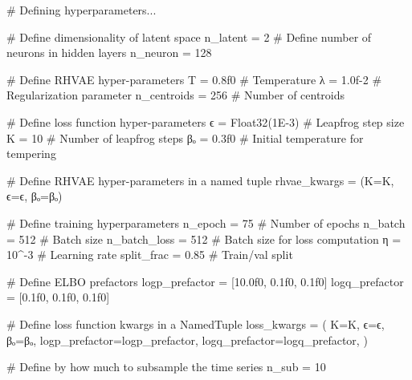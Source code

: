 \documentclass[
]{scrartcl}
\newenvironment{Shaded}{\begin{snugshade}}{\end{snugshade}}
\newcommand{\CommentTok}[1]{\textcolor[rgb]{0.37,0.37,0.37}{#1}}
\newcommand{\FloatTok}[1]{\textcolor[rgb]{0.68,0.00,0.00}{#1}}
\newcommand{\FunctionTok}[1]{\textcolor[rgb]{0.28,0.35,0.67}{#1}}
\newcommand{\NormalTok}[1]{\textcolor[rgb]{0.00,0.23,0.31}{#1}}
\newcommand{\OperatorTok}[1]{\textcolor[rgb]{0.37,0.37,0.37}{#1}}
\begin{document}
\begin{Shaded}
\begin{Highlighting}[]
\CommentTok{\# Defining hyperparameters...}

\CommentTok{\# Define dimensionality of latent space}
\NormalTok{n\_latent }\OperatorTok{=} \FloatTok{2}
\CommentTok{\# Define number of neurons in hidden layers}
\NormalTok{n\_neuron }\OperatorTok{=} \FloatTok{128}

\CommentTok{\# Define RHVAE hyper{-}parameters}
\NormalTok{T }\OperatorTok{=} \FloatTok{0.8f0} \CommentTok{\# Temperature}
\NormalTok{λ }\OperatorTok{=} \FloatTok{1.0f{-}2} \CommentTok{\# Regularization parameter}
\NormalTok{n\_centroids }\OperatorTok{=} \FloatTok{256} \CommentTok{\# Number of centroids}

\CommentTok{\# Define loss function hyper{-}parameters}
\NormalTok{ϵ }\OperatorTok{=} \FunctionTok{Float32}\NormalTok{(}\FloatTok{1E{-}3}\NormalTok{) }\CommentTok{\# Leapfrog step size}
\NormalTok{K }\OperatorTok{=} \FloatTok{10} \CommentTok{\# Number of leapfrog steps}
\NormalTok{βₒ }\OperatorTok{=} \FloatTok{0.3f0} \CommentTok{\# Initial temperature for tempering}

\CommentTok{\# Define RHVAE hyper{-}parameters in a named tuple}
\NormalTok{rhvae\_kwargs }\OperatorTok{=}\NormalTok{ (K}\OperatorTok{=}\NormalTok{K, ϵ}\OperatorTok{=}\NormalTok{ϵ, βₒ}\OperatorTok{=}\NormalTok{βₒ)}

\CommentTok{\# Define training hyperparameters}
\NormalTok{n\_epoch }\OperatorTok{=} \FloatTok{75} \CommentTok{\# Number of epochs}
\NormalTok{n\_batch }\OperatorTok{=} \FloatTok{512} \CommentTok{\# Batch size}
\NormalTok{n\_batch\_loss }\OperatorTok{=} \FloatTok{512} \CommentTok{\# Batch size for loss computation}
\NormalTok{η }\OperatorTok{=} \FloatTok{10}\OperatorTok{\^{}{-}}\FloatTok{3} \CommentTok{\# Learning rate}
\NormalTok{split\_frac }\OperatorTok{=} \FloatTok{0.85} \CommentTok{\# Train/val split}

\CommentTok{\# Define ELBO prefactors}
\NormalTok{logp\_prefactor }\OperatorTok{=}\NormalTok{ [}\FloatTok{10.0f0}\NormalTok{, }\FloatTok{0.1f0}\NormalTok{, }\FloatTok{0.1f0}\NormalTok{]}
\NormalTok{logq\_prefactor }\OperatorTok{=}\NormalTok{ [}\FloatTok{0.1f0}\NormalTok{, }\FloatTok{0.1f0}\NormalTok{, }\FloatTok{0.1f0}\NormalTok{]}

\CommentTok{\# Define loss function kwargs in a NamedTuple}
\NormalTok{loss\_kwargs }\OperatorTok{=}\NormalTok{ (}
\NormalTok{    K}\OperatorTok{=}\NormalTok{K,}
\NormalTok{    ϵ}\OperatorTok{=}\NormalTok{ϵ,}
\NormalTok{    βₒ}\OperatorTok{=}\NormalTok{βₒ,}
\NormalTok{    logp\_prefactor}\OperatorTok{=}\NormalTok{logp\_prefactor,}
\NormalTok{    logq\_prefactor}\OperatorTok{=}\NormalTok{logq\_prefactor,}
\NormalTok{)}

\CommentTok{\# Define by how much to subsample the time series}
\NormalTok{n\_sub }\OperatorTok{=} \FloatTok{10}
\end{Highlighting}
\end{Shaded}
\end{document}
